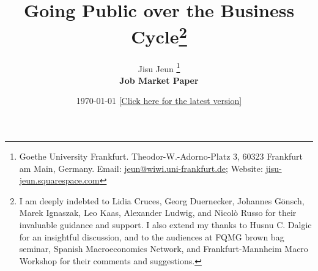 \documentclass[12pt]{article}
\begin{document}
\title{\Large{\textbf{Going Public over the Business Cycle}\thanks{
I am deeply indebted to Lidia Cruces, Georg Duernecker, Johannes G\"onsch, Marek Ignaszak, Leo Kaas, Alexander Ludwig, and Nicolò Russo for their invaluable guidance and support. I also extend my thanks to Husnu C. Dalgic for an insightful discussion, and to the audiences at FQMG brown bag seminar, Spanish Macroeconomics Network, and Frankfurt-Mannheim Macro Workshop for their comments and suggestions.}}}
\author{Jisu Jeun
\thanks{Goethe University Frankfurt. Theodor-W.-Adorno-Platz 3, 60323 Frankfurt am Main, Germany. Email: \url{jeun@wiwi.uni-frankfurt.de}{}; Website: \url{jisu-jeun.squarespace.com}{}}\\
\vspace{-0.4cm}
\vspace{0.5cm}
\textbf{Job Market Paper}\\
\vspace{-0.3cm}
\date{\today
\vspace{0.15cm}
\href{http://jisujeun.github.io/jisujeun/JMP_JisuJeun.pdf}{[Click here for the latest version]}}
}
 
\end{document}
